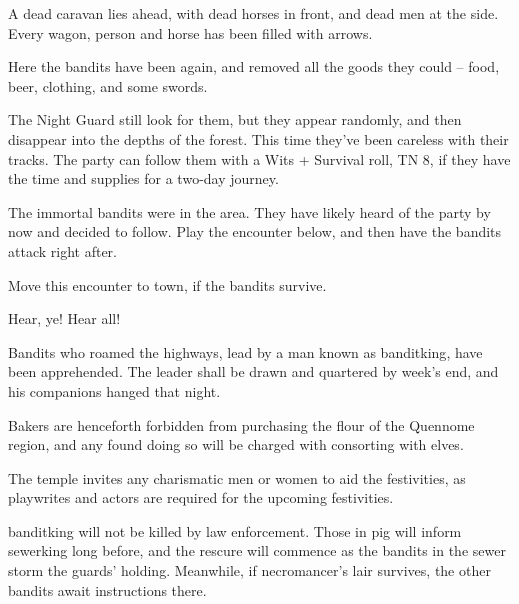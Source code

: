 \begin{multicols}{2}

\begin{boxtext}

	A dead caravan lies ahead, with dead horses in front, and dead men at the side.  Every wagon, person and horse has been filled with arrows.

\end{boxtext}

Here the bandits have been again, and removed all the goods they could -- food, beer, clothing, and some swords.

The Night Guard still look for them, but they appear randomly, and then disappear into the depths of the forest.  This time they've been careless with their tracks.  The party can follow them with a Wits + Survival roll, TN 8, if they have the time and supplies for a two-day journey.


The immortal bandits were in the area.  They have likely heard of the party by now and decided to follow.  Play the encounter below, and then have the bandits attack right after.

\humansoldier

Move this encounter to town, if the bandits survive.


\begin{boxtext}

	Hear, ye!  Hear all!

	Bandits who roamed the highways, lead by a man known as \gls{banditking}, have been apprehended.  The leader shall be drawn and quartered by week's end, and his companions hanged that night.

	Bakers are henceforth forbidden from purchasing the flour of the Quennome region, and any found doing so will be charged with consorting with elves.

	The temple invites any charismatic men or women to aid the festivities, as playwrites and actors are required for the upcoming festivities.

\end{boxtext}

\Gls{banditking} will not be killed by law enforcement.
Those in \gls{pig} will inform \gls{sewerking} long before, and the rescure will commence as the bandits in the sewer storm the guards' holding.
Meanwhile, if \gls{necromancer}'s lair survives, the other bandits await instructions there.


\end{multicols}
